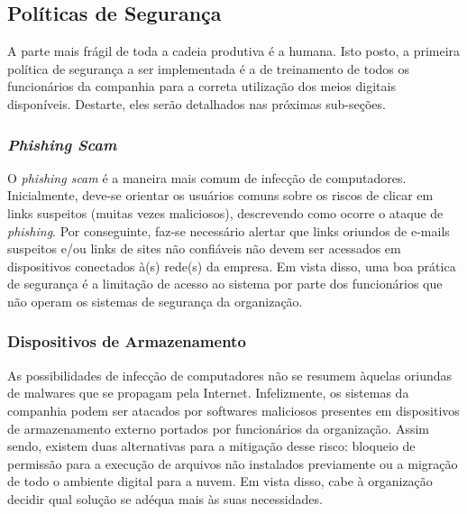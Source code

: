\documentclass[12pt]{article}
\begin{document}
\subsection{Políticas de Segurança}
A parte mais frágil de toda a cadeia produtiva é a humana. Isto posto, a primeira política de segurança a ser implementada é a de treinamento de todos os funcionários da companhia para a correta utilização dos meios digitais disponíveis. Destarte, eles serão detalhados nas próximas sub-seções.

\subsubsection{\textit{Phishing Scam}}
O \textit{phishing scam} é a maneira mais comum de infecção de computadores. Inicialmente, deve-se orientar os usuários comuns sobre os riscos de clicar em links suspeitos (muitas vezes maliciosos), descrevendo como ocorre o ataque de \textit{phishing}. Por conseguinte, faz-se necessário alertar que links oriundos de e-mails suspeitos e/ou links de sites não confiáveis não devem ser acessados em dispositivos conectados à(s) rede(s) da empresa. Em vista disso, uma boa prática de segurança é a limitação de acesso ao sistema por parte dos funcionários que não operam os sistemas de segurança da organização.

\subsubsection{Dispositivos de Armazenamento}
As possibilidades de infecção de computadores não se resumem àquelas oriundas de malwares que se propagam pela Internet. Infelizmente, os sistemas da companhia podem ser atacados por softwares maliciosos presentes em dispositivos de armazenamento externo portados por funcionários da organização. Assim sendo, existem duas alternativas para a mitigação desse risco: bloqueio de permissão para a execução de arquivos não instalados previamente ou a migração de todo o ambiente digital para a nuvem. Em vista disso, cabe à organização decidir qual solução se adéqua mais às suas necessidades.
\end{document}
